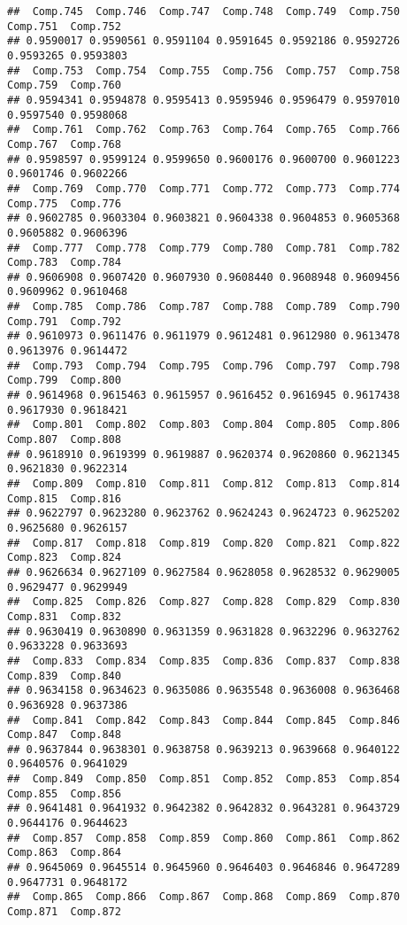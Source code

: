 \documentclass[
]{article}
\begin{document}
\begin{verbatim}
##  Comp.745  Comp.746  Comp.747  Comp.748  Comp.749  Comp.750  Comp.751  Comp.752 
## 0.9590017 0.9590561 0.9591104 0.9591645 0.9592186 0.9592726 0.9593265 0.9593803 
##  Comp.753  Comp.754  Comp.755  Comp.756  Comp.757  Comp.758  Comp.759  Comp.760 
## 0.9594341 0.9594878 0.9595413 0.9595946 0.9596479 0.9597010 0.9597540 0.9598068 
##  Comp.761  Comp.762  Comp.763  Comp.764  Comp.765  Comp.766  Comp.767  Comp.768 
## 0.9598597 0.9599124 0.9599650 0.9600176 0.9600700 0.9601223 0.9601746 0.9602266 
##  Comp.769  Comp.770  Comp.771  Comp.772  Comp.773  Comp.774  Comp.775  Comp.776 
## 0.9602785 0.9603304 0.9603821 0.9604338 0.9604853 0.9605368 0.9605882 0.9606396 
##  Comp.777  Comp.778  Comp.779  Comp.780  Comp.781  Comp.782  Comp.783  Comp.784 
## 0.9606908 0.9607420 0.9607930 0.9608440 0.9608948 0.9609456 0.9609962 0.9610468 
##  Comp.785  Comp.786  Comp.787  Comp.788  Comp.789  Comp.790  Comp.791  Comp.792 
## 0.9610973 0.9611476 0.9611979 0.9612481 0.9612980 0.9613478 0.9613976 0.9614472 
##  Comp.793  Comp.794  Comp.795  Comp.796  Comp.797  Comp.798  Comp.799  Comp.800 
## 0.9614968 0.9615463 0.9615957 0.9616452 0.9616945 0.9617438 0.9617930 0.9618421 
##  Comp.801  Comp.802  Comp.803  Comp.804  Comp.805  Comp.806  Comp.807  Comp.808 
## 0.9618910 0.9619399 0.9619887 0.9620374 0.9620860 0.9621345 0.9621830 0.9622314 
##  Comp.809  Comp.810  Comp.811  Comp.812  Comp.813  Comp.814  Comp.815  Comp.816 
## 0.9622797 0.9623280 0.9623762 0.9624243 0.9624723 0.9625202 0.9625680 0.9626157 
##  Comp.817  Comp.818  Comp.819  Comp.820  Comp.821  Comp.822  Comp.823  Comp.824 
## 0.9626634 0.9627109 0.9627584 0.9628058 0.9628532 0.9629005 0.9629477 0.9629949 
##  Comp.825  Comp.826  Comp.827  Comp.828  Comp.829  Comp.830  Comp.831  Comp.832 
## 0.9630419 0.9630890 0.9631359 0.9631828 0.9632296 0.9632762 0.9633228 0.9633693 
##  Comp.833  Comp.834  Comp.835  Comp.836  Comp.837  Comp.838  Comp.839  Comp.840 
## 0.9634158 0.9634623 0.9635086 0.9635548 0.9636008 0.9636468 0.9636928 0.9637386 
##  Comp.841  Comp.842  Comp.843  Comp.844  Comp.845  Comp.846  Comp.847  Comp.848 
## 0.9637844 0.9638301 0.9638758 0.9639213 0.9639668 0.9640122 0.9640576 0.9641029 
##  Comp.849  Comp.850  Comp.851  Comp.852  Comp.853  Comp.854  Comp.855  Comp.856 
## 0.9641481 0.9641932 0.9642382 0.9642832 0.9643281 0.9643729 0.9644176 0.9644623 
##  Comp.857  Comp.858  Comp.859  Comp.860  Comp.861  Comp.862  Comp.863  Comp.864 
## 0.9645069 0.9645514 0.9645960 0.9646403 0.9646846 0.9647289 0.9647731 0.9648172 
##  Comp.865  Comp.866  Comp.867  Comp.868  Comp.869  Comp.870  Comp.871  Comp.872 

\end{verbatim}
\end{document}
